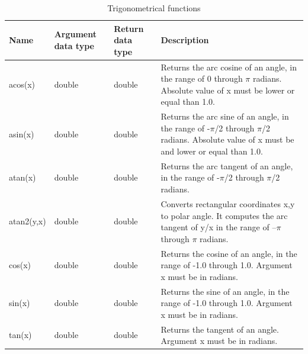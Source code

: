\documentclass[11pt,a4paper]{ivoa}
\begin{document}
\begin{table}[thm]\footnotesize
    \begin{tabular}{|p{}|p{}|p{}|p{}|}
        \hline

        \hline
        \textbf{Name} &
        \textbf{Argument \newline data type} &
        \textbf{Return \newline data type} &
        \textbf{Description} \\

        \hline
        acos(x) &
        double &
        double &
        Returns the arc cosine of an angle, in the range of 0 through \(\pi\) radians. Absolute value of x must be lower or equal than 1.0.\\

        \hline
        asin(x) &
        double &
        double &
        Returns the arc sine of an angle, in the range of -\(\pi\)/2 through \(\pi\)/2 radians. Absolute value of x must be and lower or equal than 1.0.\\

        \hline
        atan(x) &
        double &
        double &
        Returns the arc tangent of an angle, in the range of -\(\pi\)/2 through \(\pi\)/2 radians.\\
        
        \hline
        atan2(y,x) &
        double &
        double &
        Converts rectangular coordinates x,y to polar angle. It computes the arc tangent of y/x in the range of –\(\pi\) through \(\pi\) radians.\\

        \hline
        cos(x) &
        double &
        double &
        Returns the cosine of an angle, in the range of -1.0 through 1.0. Argument x must be in radians.\\

        \hline
        sin(x) &
        double &
        double &
        Returns the sine of an angle, in the range of -1.0 through 1.0. Argument x must be in radians.\\

        \hline
        tan(x) &
        double &
        double &
        Returns the tangent of an angle. Argument x must be in radians.\\

        \hline
    \end{tabular}
    \caption{Trigonometrical functions}
    \label{table:extable}
\end{table}
\end{document}
